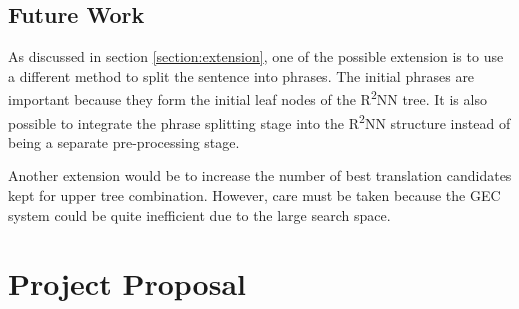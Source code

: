 \documentclass[12pt,a4paper,twoside,openright]{report}
\begin{document}
\section{Future Work}
As discussed in section \ref{section:extension}, one of the possible extension is to use a different method to split the sentence into phrases. The initial phrases are important because they form the initial leaf nodes of the R\textsuperscript{2}NN tree. It is also possible to integrate the phrase splitting stage into the R\textsuperscript{2}NN structure instead of being a separate pre-processing stage. 

Another extension would be to increase the number of best translation candidates kept for upper tree combination. However, care must be taken because the GEC system could be quite inefficient due to the large search space.




\appendix

\chapter{Project Proposal}









% 
\end{document}
